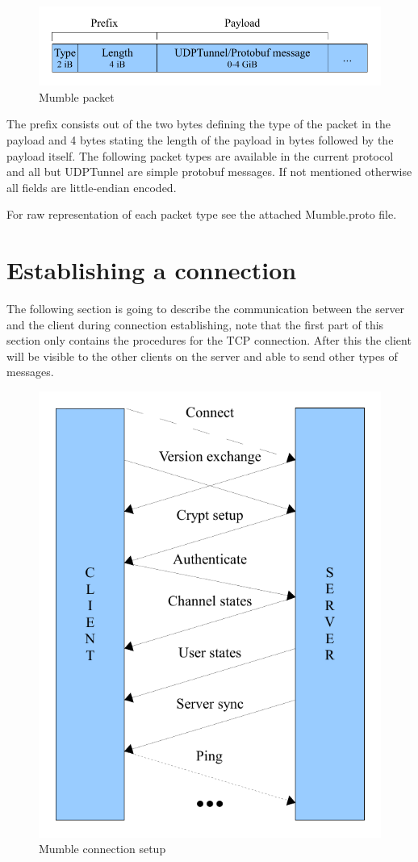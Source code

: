\documentclass[11pt]{article} %
\begin{document}
\begin{figure}[ht]
	\centering
	\includegraphics[width=0.8\linewidth]{resources/mumble_packet}
	\caption{Mumble packet}
	\label{fig:mumble_packet}
\end{figure}

The prefix consists out of the two bytes defining the type of the packet in the payload and 4 bytes stating the length of the payload in bytes followed by the payload itself. The following packet types are available in the current protocol and all but UDPTunnel are simple protobuf messages. If not mentioned otherwise all fields are little-endian encoded.


For raw representation of each packet type see the attached Mumble.proto file.

\section{Establishing a connection}
The following section is going to describe the communication between the server and the client during connection establishing, note that the first part of this section only contains the procedures for the TCP connection. After this the client will be visible to the other clients on the server and able to send other types of messages.

\begin{figure}[ht]
	\centering
	\includegraphics[width=0.7\linewidth]{resources/mumble_connection_setup}
	\caption{Mumble connection setup}
	\label{fig:mumble_connection_setup}
\end{figure}
\end{document}
